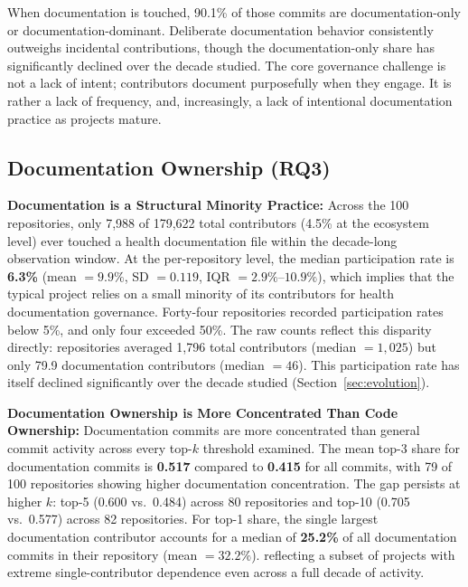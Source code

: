 \documentclass[10pt,conference]{IEEEtran}
\begin{document}
{{\begin{tcolorbox}[colback=heatmaplight,
                  colframe=heatmapdark,
                  coltitle=white,
                  fonttitle=\bfseries,
                  title=Summary --- RQ2]
When documentation is touched, 90.1\% of those commits are documentation-only or documentation-dominant. Deliberate documentation behavior consistently outweighs incidental contributions, though the documentation-only share has significantly declined over the decade studied.
The core governance challenge is not a lack of intent; contributors document purposefully when they engage. It is rather a lack of frequency, and, increasingly, a lack of intentional documentation practice as projects mature.

\end{tcolorbox}


\subsection{Documentation Ownership (RQ3)}

\textbf{Documentation is a Structural Minority Practice:}
Across the 100 repositories, only 7,988 of 179,622 total contributors (4.5\% at the ecosystem level) ever touched a health documentation file within the decade-long observation window. At the per-repository level, the median participation rate
is \textbf{6.3\%} (mean $= 9.9\%$, SD $= 0.119$,
IQR $= 2.9\%$--$10.9\%$), which implies that the typical project relies on a small minority of its contributors for health documentation governance. Forty-four repositories recorded participation rates below 5\%, and only four exceeded 50\%.
The raw counts reflect this disparity directly: repositories averaged 1,796 total contributors (median $= 1,025$) but only 79.9 documentation contributors (median $= 46$). This participation rate has itself declined significantly over the decade studied (Section~\ref{sec:evolution}).

\textbf{Documentation Ownership is More Concentrated Than Code Ownership:}
Documentation commits are more concentrated than general commit activity across every top-$k$ threshold examined.
The mean top-3 share for documentation commits is
\textbf{0.517} compared to \textbf{0.415} for all commits, with 79 of 100 repositories showing higher documentation concentration. The gap persists at higher $k$: top-5 (0.600 vs.\ 0.484) across 80 repositories and top-10 (0.705 vs.\ 0.577) across 82 repositories. For top-1 share, the single largest documentation contributor accounts for a median of \textbf{25.2\%} of all documentation commits in their repository (mean $= 32.2\%$).
reflecting a subset of projects with extreme
single-contributor dependence even across a full decade of activity.

}}
\end{document}
